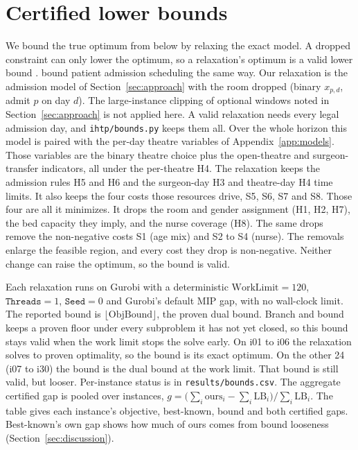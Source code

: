 \documentclass[11pt]{article}
\newcommand{\Sc}[1]{\textsf{S#1}}
\newcommand{\Hc}[1]{\textsf{H#1}}
\begin{document}
	\section{Certified lower bounds}\label{app:bounds}
	We bound the true optimum from below by relaxing the exact model. A dropped constraint can only lower the optimum, so a relaxation's optimum is a valid lower bound \citep{wolsey1998}. \citet{ceschia2011} bound patient admission scheduling the same way. Our relaxation is the admission model of Section~\ref{sec:approach} with the room dropped (binary $x_{p,d}$, admit $p$ on day $d$). The large-instance clipping of optional windows noted in Section~\ref{sec:approach} is not applied here. A valid relaxation needs every legal admission day, and \texttt{ihtp/bounds.py} keeps them all. Over the whole horizon this model is paired with the per-day theatre variables of Appendix~\ref{app:models}. Those variables are the binary theatre choice plus the open-theatre and surgeon-transfer indicators, all under the per-theatre \Hc4. The relaxation keeps the admission rules \Hc5 and \Hc6 and the surgeon-day \Hc3 and theatre-day \Hc4 time limits. It also keeps the four costs those resources drive, \Sc5, \Sc6, \Sc7 and \Sc8. Those four are all it minimizes. It drops the room and gender assignment (\Hc1, \Hc2, \Hc7), the bed capacity they imply, and the nurse coverage (\Hc8). The same drops remove the non-negative costs \Sc1 (age mix) and \Sc2 to \Sc4 (nurse). The removals enlarge the feasible region, and every cost they drop is non-negative. Neither change can raise the optimum, so the bound is valid.

	Each relaxation runs on Gurobi with a deterministic $\mathrm{WorkLimit}=120$, $\mathtt{Threads}=1$, $\mathtt{Seed}=0$ and Gurobi's default MIP gap, with no wall-clock limit. The reported bound is $\lfloor\mathrm{ObjBound}\rfloor$, the proven dual bound. Branch and bound keeps a proven floor under every subproblem it has not yet closed, so this bound stays valid when the work limit stops the solve early. On i01 to i06 the relaxation solves to proven optimality, so the bound is its exact optimum. On the other 24 (i07 to i30) the bound is the dual bound at the work limit. That bound is still valid, but looser. Per-instance status is in \texttt{results/bounds.csv}. The aggregate certified gap is pooled over instances, $g=\big(\sum_i \mathrm{ours}_i-\sum_i \mathrm{LB}_i\big)/\sum_i \mathrm{LB}_i$. The table gives each instance's objective, best-known, bound and both certified gaps. Best-known's own gap shows how much of ours comes from bound looseness (Section~\ref{sec:discussion}).
	
\end{document}
